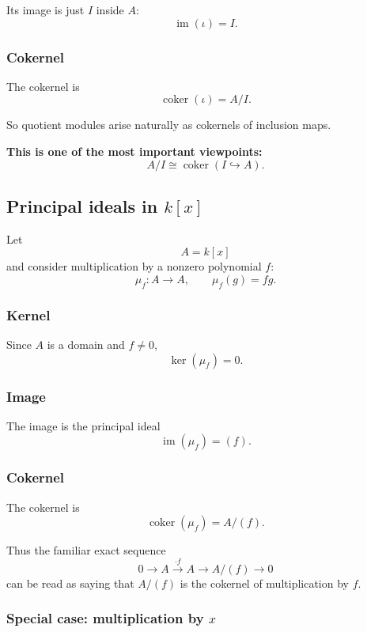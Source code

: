 \documentclass[12pt,a4paper]{article}
\theoremstyle{notespace}
\theoremstyle{definition}
\begin{document}
Its image is just \(I\) inside \(A\):
\[
\operatorname{im}(\iota)=I.
\]

\subsubsection*{Cokernel}

The cokernel is
\[
\operatorname{coker}(\iota)=A/I.
\]

So quotient modules arise naturally as cokernels of inclusion maps.

\medskip

\textbf{This is one of the most important viewpoints:}
\[
A/I \cong \operatorname{coker}(I\hookrightarrow A).
\]

\subsection{ Principal ideals in \(k[x]\)}

Let
\[
A=k[x]
\]
and consider multiplication by a nonzero polynomial \(f\):
\[
\mu_f:A\longrightarrow A,
\qquad
\mu_f(g)=fg.
\]

\subsubsection*{Kernel}

Since \(A\) is a domain and \(f\neq 0\),
\[
\ker(\mu_f)=0.
\]

\subsubsection*{Image}

The image is the principal ideal
\[
\operatorname{im}(\mu_f)=(f).
\]

\subsubsection*{Cokernel}

The cokernel is
\[
\operatorname{coker}(\mu_f)=A/(f).
\]

Thus the familiar exact sequence
\[
0\longrightarrow A\xrightarrow{\cdot f} A \longrightarrow A/(f)\longrightarrow 0
\]
can be read as saying that \(A/(f)\) is the cokernel of multiplication by \(f\).

\subsubsection*{Special case: multiplication by \(x\)}
\end{document}
